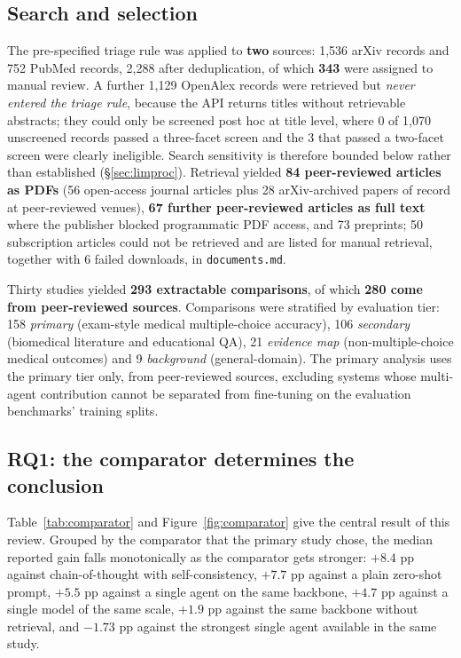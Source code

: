 \documentclass[11pt,a4paper]{article}
\begin{document}
\subsection{Search and selection}
The pre-specified triage rule was applied to \textbf{two} sources: 1{,}536 arXiv records and
752 PubMed records, 2{,}288 after deduplication, of which \textbf{343} were assigned to manual
review. A further 1{,}129 OpenAlex records were retrieved but \emph{never entered the triage
rule}, because the API returns titles without retrievable abstracts; they could only be
screened post hoc at title level, where 0 of 1{,}070 unscreened records passed a three-facet
screen and the 3 that passed a two-facet screen were clearly ineligible. Search sensitivity
is therefore bounded below rather than established (\S\ref{sec:limproc}). Retrieval yielded \textbf{84 peer-reviewed articles as PDFs} (56 open-access
journal articles plus 28 arXiv-archived papers of record at peer-reviewed venues),
\textbf{67 further peer-reviewed articles as full text} where the publisher blocked
programmatic PDF access, and 73 preprints; 50 subscription articles could not be retrieved
and are listed for manual retrieval, together with 6 failed downloads, in
\texttt{documents.md}.

Thirty studies yielded \textbf{293 extractable comparisons}, of which \textbf{280 come from
peer-reviewed sources}. Comparisons were stratified by evaluation tier: 158 \emph{primary}
(exam-style medical multiple-choice accuracy), 106 \emph{secondary} (biomedical literature
and educational QA), 21 \emph{evidence map} (non-multiple-choice medical outcomes) and 9
\emph{background} (general-domain). The primary analysis uses the primary tier only, from
peer-reviewed sources, excluding systems whose multi-agent contribution cannot be separated
from fine-tuning on the evaluation benchmarks' training splits.

\subsection{RQ1: the comparator determines the conclusion}
Table~\ref{tab:comparator} and Figure~\ref{fig:comparator} give the central result of this
review. Grouped by the comparator that the primary study chose, the median reported gain
falls monotonically as the comparator gets stronger: $+8.4$ pp against chain-of-thought with
self-consistency, $+7.7$ pp against a plain zero-shot prompt, $+5.5$ pp against a single
agent on the same backbone, $+4.7$ pp against a single model of the same scale, $+1.9$ pp
against the same backbone without retrieval, and $\mathbf{-1.73}$ pp against the strongest
single agent available in the same study.
\end{document}
